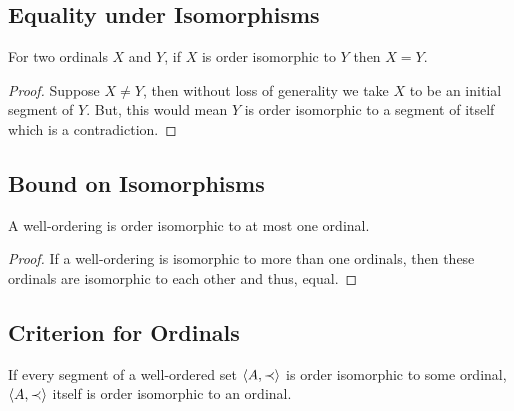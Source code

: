 \subsection{Equality under Isomorphisms}

For two ordinals $X$ and $Y$, if $X$ is order isomorphic to
$Y$ then $X = Y$.

\begin{proof}
    Suppose $X \neq Y$, then without loss of generality we take
    $X$ to be an initial segment of $Y$. But, this would
    mean $Y$ is order isomorphic to a segment of itself
    which is a contradiction.
\end{proof}

\subsection{Bound on Isomorphisms}

A well-ordering is order isomorphic to at most one
ordinal.

\begin{proof}
    If a well-ordering is isomorphic to more than one
    ordinals, then these ordinals are isomorphic to each other
    and thus, equal.
\end{proof}

\subsection{Criterion for Ordinals}

If every segment of a well-ordered set $\langle A, \prec \rangle$ is 
order isomorphic to some ordinal, $\langle A, \prec \rangle$ itself
is order isomorphic to an ordinal.

